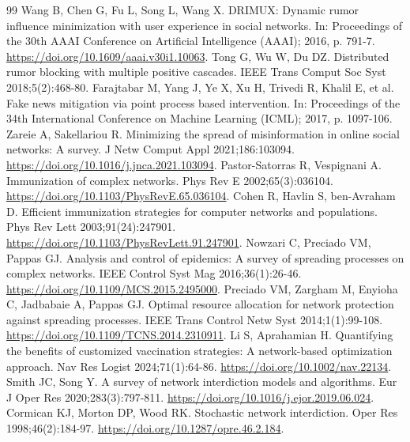 \documentclass[preprint,11pt]{elsarticle}
\theoremstyle{definition}
\theoremstyle{remark}
\begin{document}
\begin{thebibliography}{99}
Wang B, Chen G, Fu L, Song L, Wang X. DRIMUX: Dynamic rumor influence minimization with user experience in social networks. In: Proceedings of the 30th AAAI Conference on Artificial Intelligence (AAAI); 2016, p. 791-7. \url{https://doi.org/10.1609/aaai.v30i1.10063}.
Tong G, Wu W, Du DZ. Distributed rumor blocking with multiple positive cascades. IEEE Trans Comput Soc Syst 2018;5(2):468-80.
Farajtabar M, Yang J, Ye X, Xu H, Trivedi R, Khalil E, et al. Fake news mitigation via point process based intervention. In: Proceedings of the 34th International Conference on Machine Learning (ICML); 2017, p. 1097-106.
Zareie A, Sakellariou R. Minimizing the spread of misinformation in online social networks: A survey. J Netw Comput Appl 2021;186:103094. \url{https://doi.org/10.1016/j.jnca.2021.103094}.
Pastor-Satorras R, Vespignani A. Immunization of complex networks. Phys Rev E 2002;65(3):036104. \url{https://doi.org/10.1103/PhysRevE.65.036104}.
Cohen R, Havlin S, ben-Avraham D. Efficient immunization strategies for computer networks and populations. Phys Rev Lett 2003;91(24):247901. \url{https://doi.org/10.1103/PhysRevLett.91.247901}.
Nowzari C, Preciado VM, Pappas GJ. Analysis and control of epidemics: A survey of spreading processes on complex networks. IEEE Control Syst Mag 2016;36(1):26-46. \url{https://doi.org/10.1109/MCS.2015.2495000}.
Preciado VM, Zargham M, Enyioha C, Jadbabaie A, Pappas GJ. Optimal resource allocation for network protection against spreading processes. IEEE Trans Control Netw Syst 2014;1(1):99-108. \url{https://doi.org/10.1109/TCNS.2014.2310911}.
Li S, Aprahamian H. Quantifying the benefits of customized vaccination strategies: A network-based optimization approach. Nav Res Logist 2024;71(1):64-86. \url{https://doi.org/10.1002/nav.22134}.
Smith JC, Song Y. A survey of network interdiction models and algorithms. Eur J Oper Res 2020;283(3):797-811. \url{https://doi.org/10.1016/j.ejor.2019.06.024}.
Cormican KJ, Morton DP, Wood RK. Stochastic network interdiction. Oper Res 1998;46(2):184-97. \url{https://doi.org/10.1287/opre.46.2.184}.

\end{thebibliography}
\end{document}
